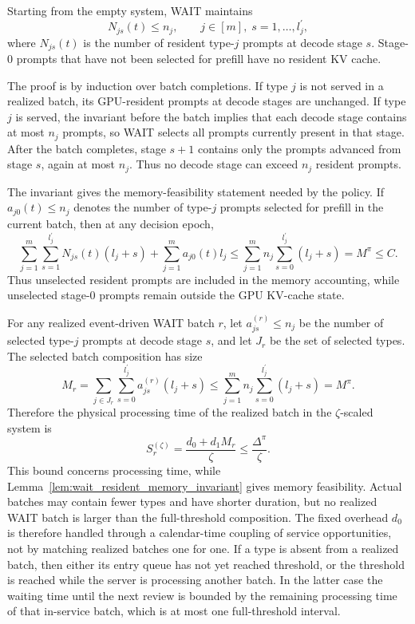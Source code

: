 \begin{lemma}\label{lem:wait_resident_memory_invariant}
Starting from the empty system, WAIT maintains
\[
    N_{js}(t)\le n_j,\qquad j\in[m],\; s=1,\ldots,l_j^\prime,
\]
where \(N_{js}(t)\) is the number of resident type-\(j\) prompts at decode stage \(s\). Stage-0 prompts that have not been selected for prefill have no resident KV cache.
\end{lemma}
\noindent The proof is by induction over batch completions. If type \(j\) is not served in a realized batch, its GPU-resident prompts at decode stages are unchanged. If type \(j\) is served, the invariant before the batch implies that each decode stage contains at most \(n_j\) prompts, so WAIT selects all prompts currently present in that stage. After the batch completes, stage \(s+1\) contains only the prompts advanced from stage \(s\), again at most \(n_j\). Thus no decode stage can exceed \(n_j\) resident prompts.

The invariant gives the memory-feasibility statement needed by the policy. If \(a_{j0}(t)\le n_j\) denotes the number of type-\(j\) prompts selected for prefill in the current batch, then at any decision epoch,
\[
    \sum_{j=1}^m\sum_{s=1}^{l_j^\prime}N_{js}(t)(l_j+s)
    +
    \sum_{j=1}^m a_{j0}(t)l_j
    \le
    \sum_{j=1}^m n_j\sum_{s=0}^{l_j^\prime}(l_j+s)
    =
    M^\pi
    \le C .
\]
Thus unselected resident prompts are included in the memory accounting, while unselected stage-0 prompts remain outside the GPU KV-cache state.

For any realized event-driven WAIT batch \(r\), let \(a^{(r)}_{js}\le n_j\) be the number of selected type-\(j\) prompts at decode stage \(s\), and let \(J_r\) be the set of selected types. The selected batch composition has size
\[
    M_r
    =
    \sum_{j\in J_r}\sum_{s=0}^{l_j^\prime} a^{(r)}_{js}(l_j+s)
    \le
    \sum_{j=1}^m n_j\sum_{s=0}^{l_j^\prime}(l_j+s)
    =
    M^\pi.
\]
Therefore the physical processing time of the realized batch in the \(\zeta\)-scaled system is
\[
    S_r^{(\zeta)}
    =
    \frac{d_0+d_1M_r}{\zeta}
    \le
    \frac{\Delta^\pi}{\zeta}.
\]
This bound concerns processing time, while Lemma~\ref{lem:wait_resident_memory_invariant} gives memory feasibility. Actual batches may contain fewer types and have shorter duration, but no realized WAIT batch is larger than the full-threshold composition. The fixed overhead \(d_0\) is therefore handled through a calendar-time coupling of service opportunities, not by matching realized batches one for one. If a type is absent from a realized batch, then either its entry queue has not yet reached threshold, or the threshold is reached while the server is processing another batch. In the latter case the waiting time until the next review is bounded by the remaining processing time of that in-service batch, which is at most one full-threshold interval.

